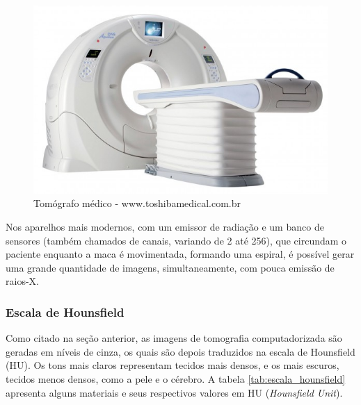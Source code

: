 \begin{figure}[!htb]
\centering
\includegraphics[scale=0.4]{img/tomografo.jpg}
\caption{Tomógrafo médico - www.toshibamedical.com.br}
\end{figure}


Nos aparelhos mais modernos, com um emissor de radiação e um banco de
sensores (também chamados de canais, variando de 2 até 256), que circundam o paciente
enquanto a maca é movimentada, formando uma espiral, é possível gerar uma
grande quantidade de imagens, simultaneamente, com pouca emissão de raios-X.


\subsubsection{Escala de Hounsfield}
Como citado na seção anterior, as imagens de tomografia computadorizada
são geradas em níveis de cinza, os quais são depois traduzidos na escala
de Hounsfield (HU). Os tons mais claros representam tecidos mais densos, e
os mais escuros, tecidos menos densos, como a pele e o cérebro.
A tabela \ref{tab:escala_hounsfield} apresenta alguns materiais e seus 
respectivos valores em HU (\textit{Hounsfield Unit}).


